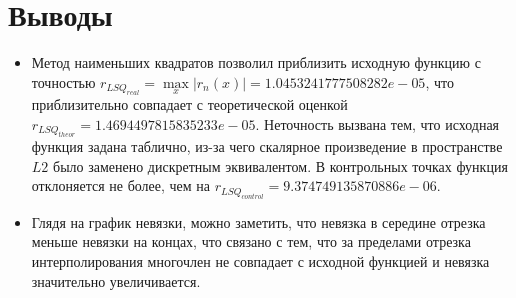 \documentclass[14pt, a4paper]{article}
\begin{document}
  \section{Выводы}
  \begin{itemize}
  \item
  Метод наименьших квадратов позволил приблизить исходную функцию с точностью $r_{LSQ_{real}} = \max\limits_x |r_n(x)| = 1.0453241777508282e-05$, что приблизительно совпадает с теоретической оценкой $r_{LSQ_{theor}} = 1.4694497815835233e-05$. Неточность вызвана тем, что исходная функция задана таблично, из-за чего скалярное произведение в пространстве $L2$ было заменено дискретным эквивалентом. В контрольных точках функция отклоняется не более, чем на $r_{LSQ_{control}} = 9.374749135870886e-06$.
  \item
  Глядя на график невязки, можно заметить, что невязка в середине отрезка меньше невязки на концах, что связано с тем, что за пределами отрезка интерполирования многочлен не совпадает с исходной функцией и невязка значительно увеличивается.
  \end{itemize}
\end{document}
